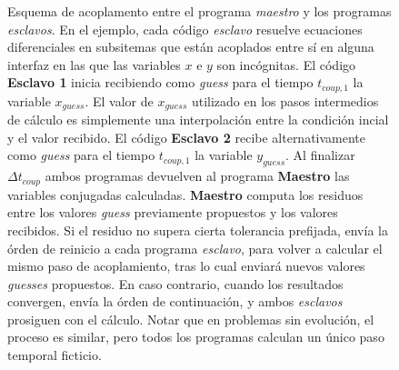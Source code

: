\begin{figure}
\begin{tikzpicture}
\end{tikzpicture}
\caption[Esquema de acoplamiento implementado]{Esquema de acoplamento entre el programa \textit{maestro} y los programas \textit{esclavos}.
En el ejemplo, cada código \textit{esclavo} resuelve ecuaciones diferenciales en subsitemas que están acoplados entre sí en alguna interfaz en las que las variables $x$ e $y$ son incógnitas.
El código \textbf{Esclavo 1} inicia recibiendo como \textit{guess} para el tiempo $t_{coup,1}$ la variable $x_{guess}$.
El valor de $x_{guess}$ utilizado en los pasos intermedios de cálculo es simplemente una interpolación entre la condición incial y el valor recibido.
El código \textbf{Esclavo 2} recibe alternativamente como \textit{guess} para el tiempo $t_{coup,1}$ la variable $y_{guess}$.
Al finalizar $\Delta t_{coup}$ ambos programas devuelven al programa \textbf{Maestro} las variables conjugadas calculadas.
\textbf{Maestro} computa los residuos entre los valores \textit{guess} previamente propuestos y los valores recibidos.
Si el residuo no supera cierta tolerancia prefijada, envía la órden de reinicio a cada programa \textit{esclavo}, 
para volver a calcular el mismo paso de acoplamiento, tras lo cual enviará nuevos valores \textit{guesses} propuestos.
En caso contrario, cuando los resultados convergen, envía la órden de continuación, y ambos \textit{esclavos} prosiguen con el cálculo.
Notar que en problemas sin evolución, el proceso es similar, pero todos los programas calculan un único paso temporal ficticio.
}
\label{esquema-evolucion}
\end{figure}
